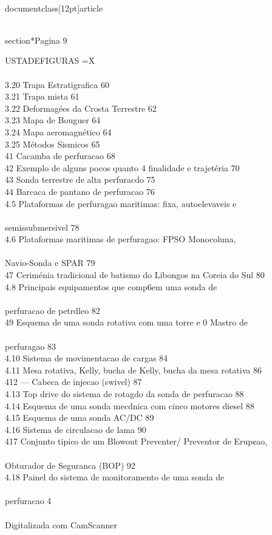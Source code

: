 \\documentclass[12pt]{article}
\begin{document}
\\section*{Pagina 9}

USTADEFIGURAS =X\\
\\
3.20 Trapa Estratigrafica 60\\
3.21 Trapa mista 61\\
3.22 Deformagées da Crosta Terrestre 62\\
3.23 Mapa de Bouguer 64\\
3.24 Mapa aeromagnético 64\\
3.25 Métodos Sismicos 65\\
41 Cacamba de perfuracao 68\\
42 Exemplo de alguns pocos quanto 4 finalidade e trajetéria 70\\
43 Sonda terrestre de alta perfuracdo 75\\
44 Barcaca de pantano de perfuracao 76\\
4.5 Plataformas de perfuragao maritimas: fixa, autoelevaveis e\\
\\
semissubmersivel 78\\
4.6 Plataformas maritimas de perfuragao: FPSO Monocoluna,\\
\\
Navio-Sonda e SPAR 79\\
47 Ceriménia tradicional de batismo do Libongos na Coreia do Sul 80\\
4.8 Principais equipamentos que comp6em uma sonda de\\
\\
perfuracao de petrdleo 82\\
49 Esquema de uma sonda rotativa com uma torre e 0 Mastro de\\
\\
perfuragao 83\\
4.10 Sistema de movimentacao de cargas 84\\
4.11 Mesa rotativa, Kelly, bucha de Kelly, bucha da mesa rotativa 86\\
412 — Cabeca de injecao (swivel) 87\\
4.13 Top drive do sistema de rotagdo da sonda de perfuracao 88\\
4.14 Esquema de uma sonda mecdnica com cinco motores diesel 88\\
4.15  Esquema de uma sonda AC/DC 89\\
4.16 Sistema de circulacao de lama 90\\
417 Conjunto tipico de um Blowout Preventer/ Preventor de Erup¢ao,\\
\\
Obturador de Seguranca (BOP) 92\\
4.18 Painel do sistema de monitoramento de uma sonda de\\
\\
perfuracao 4\\
\\
Digitalizada com CamScanner\\
\end{document}
